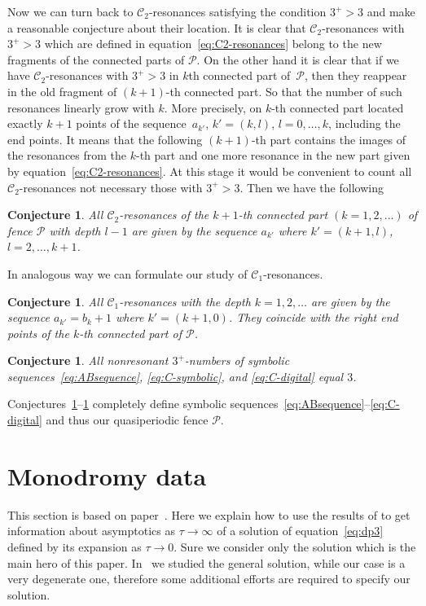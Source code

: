 \documentclass[pdftex]{sigma}
\numberwithin{equation}{section}
\newtheorem{Conjecture}[Theorem]{Conjecture}
\begin{document}
Now we can turn back to $\mathcal{C}_2$-resonances satisfying the condition $3^+>3$ and make a reasonable conjecture about
their location. It is clear that $\mathcal{C}_2$-resonances with $3^+>3$ which are defined in equation~\eqref{eq:C2-resonances}
belong to the new fragments of the connected parts of $\mathcal{P}$. On the other hand it is clear that
if we have $\mathcal{C}_2$-resonances with $3^+>3$ in $k$th connected part of~$\mathcal{P}$, then they reappear in the
old fragment of $(k+1)$-th connected part. So that the number of such resonances linearly grow with $k$. More precisely,
on $k$-th connected part located exactly $k+1$ points of the sequence~$a_{k'}$, $k'=(k,l)$, $l=0,\ldots,k$, including the end points.
It means that the following $(k+1)$-th part contains the images of the resonances from the $k$-th part and one more resonance
in the new part given by equation~\eqref{eq:C2-resonances}. At this stage it would be convenient to count all $\mathcal{C}_2$-resonances
not necessary those with $3^+>3$. Then we have the following
\begin{Conjecture}\label{con:C2-resonances}
All $\mathcal{C}_2$-resonances of the $k+1$-th connected part $(k=1,2,\ldots)$ of fence $\mathcal{P}$ with depth $l-1$ are
given by the sequence $a_{k'}$ where $k'=(k+1,l)$, $l=2,\ldots, k+1$.
\end{Conjecture}
In analogous way we can formulate our study of $\mathcal{C}_1$-resonances.
\begin{Conjecture}\label{con:C1-resonances}
All $\mathcal{C}_1$-resonances with the depth $k=1,2,\ldots$ are given by the sequence
$a_{k'}=b_k+1$ where $k'=(k+1,0)$. They coincide with the right end points of the $k$-th connected part of $\mathcal{P}$.
\end{Conjecture}
\begin{Conjecture}\label{con:nonresonance3+}
All nonresonant $3^+$-numbers of symbolic sequences~\eqref{eq:ABsequence}, \eqref{eq:C-symbolic}, and \eqref{eq:C-digital}
equal $3$.
\end{Conjecture}
Conjectures~\ref{con:C2-resonances}--\ref{con:nonresonance3+} completely define symbolic
sequences~\eqref{eq:ABsequence}--\eqref{eq:C-digital} and thus our quasipe\-rio\-dic fence $\mathcal{P}$.

\section{Monodromy data}\label{sec:monodromy}
This section is based on paper~\cite{KV2004}.
Here we explain how to use the results of \cite{KV2004} to get information about
asymptotics as $\tau\to\infty$ of a solution of equation~\eqref{eq:dp3} defined by its expansion as $\tau\to0$.
Sure we consider only the solution which is the main hero of this paper. In~\cite{KV2004} we studied the
general solution, while our case is a very degenerate one, therefore some additional efforts are required to
specify our solution.
\end{document}
